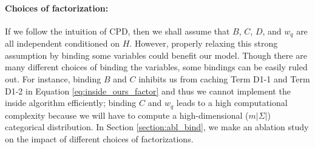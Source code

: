 \documentclass[11pt,a4paper]{article}
\begin{document}
\paragraph{Choices of factorization:}
If we follow the intuition of CPD, then we shall assume that $B$, $C$, $D$, and $w_q$ are all independent conditioned on $H$. However, properly relaxing this strong assumption by binding some variables could benefit our model.
Though there are many different choices of binding the variables,
some bindings can be easily ruled out.
For instance, binding $B$ and $C$ inhibits us from caching Term D1-1 and Term D1-2 in Equation \ref{eq:inside_ours_factor} and thus we cannot implement the inside algorithm efficiently;
binding $C$ and $w_q$ leads to a high computational complexity because we will have to compute a high-dimensional ($m|\Sigma|$) categorical distribution. In Section \ref{section:abl_bind}, we make an ablation study on the impact of different choices of factorizations.
\end{document}
